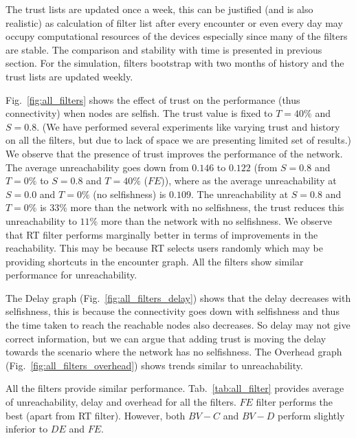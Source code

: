 \documentclass[10pt,conference]{IEEEtran}
\begin{document}
 
The trust lists are updated once a week, this can be justified (and is also realistic) as calculation of filter list after every encounter or even every day may occupy computational resources of the devices especially since many of the filters are stable. The comparison and stability with time is presented in previous section. For the simulation, filters bootstrap with two months of history and the trust lists are updated weekly.

 Fig.~\ref{fig:all_filters} shows the effect of trust on the performance (thus connectivity) when nodes are selfish. The trust value is fixed to $T=40\%$ and $S=0.8$. (We have performed several experiments like varying trust and history on all the filters, but due to lack of space we are presenting limited set of results.) We observe that the  presence of trust improves the performance of the network. The average unreachability goes down from $0.146$ to $0.122$ (from $S=0.8$ and $T=0\%$ to $S=0.8$ and $T=40\%$ ($FE$)), where as the average unreachability at $S=0.0$ and $T=0\%$ (no selfishness)  is $0.109$. The unreachability at $S=0.8$ and $T=0\%$ is $33\%$ more than the network with no selfishness, the trust reduces this unreachability to $11\%$ more than the network with no selfishness. We observe that RT filter performs marginally better in terms of improvements in the reachability. This may be because RT selects users randomly which may be providing shortcuts in the encounter graph. All the filters show similar performance for unreachability.

The Delay graph (Fig.~\ref{fig:all_filters_delay}) shows that the delay decreases with selfishness, this is because the connectivity goes down with selfishness and thus the time taken to reach the reachable nodes also decreases. So delay may not give correct information, but we can argue that adding trust is moving the delay towards the scenario where the network has no selfishness. The Overhead graph (Fig.~\ref{fig:all_filters_overhead}) shows trends similar to unreachability.  

All the filters provide similar performance. Tab.~\ref{tab:all_filter} provides average of unreachability, delay and overhead for all the filters. $FE$ filter performs the best (apart from RT filter). However, both $BV-C$ and $BV-D$ perform slightly inferior to $DE$ and $FE$. 
\end{document}
